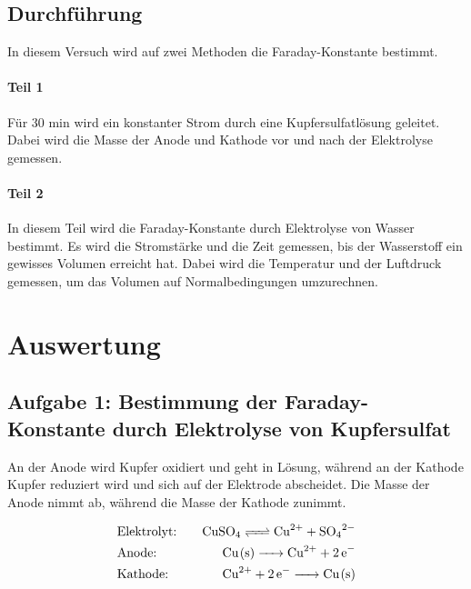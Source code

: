 \documentclass[12pt,a4paper,titlepage]{scrartcl}
\numberwithin{equation}{section}
\numberwithin{table}{section}
\numberwithin{figure}{section}
\begin{document}



\subsection{Durchführung}

In diesem Versuch wird auf zwei Methoden die Faraday-Konstante bestimmt.

\paragraph{Teil 1}
Für 30 min wird ein konstanter Strom durch eine Kupfersulfatlösung geleitet. Dabei wird die Masse der Anode und Kathode vor und nach der Elektrolyse gemessen.

\paragraph{Teil 2}
In diesem Teil wird die Faraday-Konstante durch Elektrolyse von Wasser bestimmt. Es wird die Stromstärke und die Zeit gemessen, bis der Wasserstoff ein gewisses Volumen erreicht hat. Dabei wird die Temperatur und der Luftdruck gemessen, um das Volumen auf Normalbedingungen umzurechnen.


\section{Auswertung}

\subsection{Aufgabe 1: Bestimmung der Faraday-Konstante durch Elektrolyse von Kupfersulfat}

An der Anode wird Kupfer oxidiert und geht in Lösung, während an der Kathode Kupfer reduziert wird und sich auf der Elektrode abscheidet. Die Masse der Anode nimmt ab, während die Masse der Kathode zunimmt.


\begin{align}
        &\text{Elektrolyt:} \quad \ce{&CuSO4 <=> Cu^{2+} + SO4^{2-}}\\
        &\text{Anode:} \quad \ce{&Cu(s) -> Cu^{2+} + 2e^-}\\
        &\text{Kathode:} \quad \ce{&Cu^{2+} + 2e^- -> Cu(s)}
\end{align}
\end{document}
